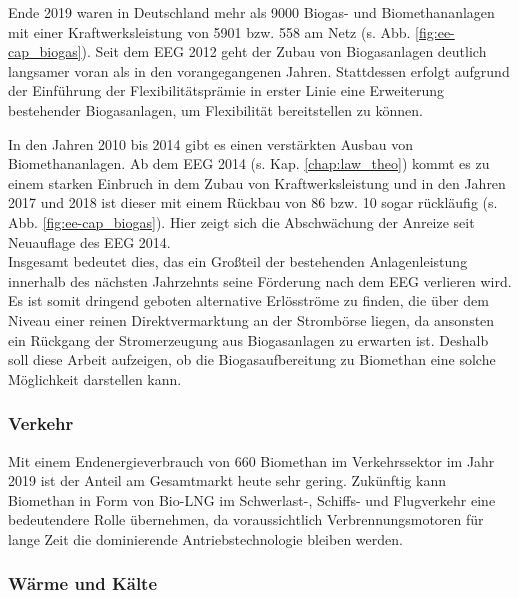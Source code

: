 

Ende 2019 waren in Deutschland mehr als \SI{9000}{\relax} Biogas- und Biomethananlagen mit einer Kraftwerksleistung von \SI{5901}{\mw} bzw. \SI{558}{\mw} am Netz (s. Abb. \ref{fig:ee-cap_biogas}). Seit dem EEG 2012 geht der Zubau von Biogasanlagen deutlich langsamer voran als in den vorangegangenen Jahren. Stattdessen erfolgt aufgrund der Einführung der Flexibilitätsprämie in erster Linie eine Erweiterung bestehender Biogasanlagen, um Flexibilität bereitstellen zu können. \parencite{BWE2020} \parencite{DanielGromke2019}



In den Jahren 2010 bis 2014 gibt es einen verstärkten Ausbau von Biomethananlagen. Ab dem EEG 2014 (s. Kap. \ref{chap:law_theo}) kommt es zu einem starken Einbruch in dem Zubau von Kraftwerksleistung und in den Jahren 2017 und 2018 ist dieser mit einem Rückbau von \SI{86}{\mw} bzw. \SI{10}{\mw} sogar rückläufig (s. Abb. \ref{fig:ee-cap_biogas}). \parencite{BWE2020} Hier zeigt sich die Abschwächung der Anreize seit Neuauflage des EEG 2014.\medskip\\
Insgesamt bedeutet dies, das ein Großteil der bestehenden Anlagenleistung innerhalb des nächsten Jahrzehnts seine Förderung nach dem EEG verlieren wird. Es ist somit dringend geboten alternative Erlösströme zu finden, die über dem Niveau einer reinen Direktvermarktung an der Strombörse liegen, da ansonsten ein Rückgang der Stromerzeugung aus Biogasanlagen zu erwarten ist. Deshalb soll diese Arbeit aufzeigen, ob die Biogasaufbereitung zu Biomethan eine solche Möglichkeit darstellen kann.


\subsubsection{Verkehr}

Mit einem Endenergieverbrauch von \SI{660}{\gwh} Biomethan im Verkehrssektor im Jahr 2019 ist der Anteil am Gesamtmarkt heute sehr gering. \parencite{BWE2020} Zukünftig kann Biomethan in Form von Bio-\gls{LNG} im Schwerlast-, Schiffs- und Flugverkehr eine bedeutendere Rolle übernehmen, da voraussichtlich Verbrennungsmotoren für lange Zeit die dominierende Antriebstechnologie bleiben werden. \parencite{dena2017}

\subsubsection{Wärme und Kälte}
